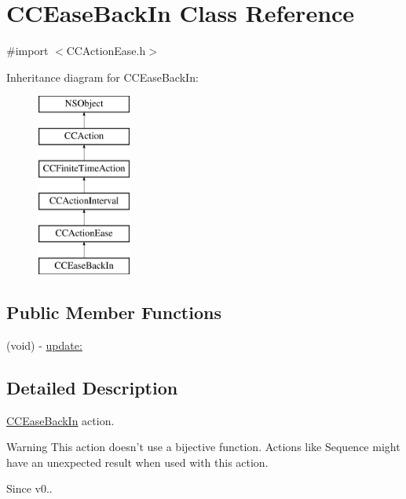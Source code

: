 \hypertarget{interface_c_c_ease_back_in}{\section{C\-C\-Ease\-Back\-In Class Reference}
\label{interface_c_c_ease_back_in}
}


{\ttfamily \#import $<$C\-C\-Action\-Ease.\-h$>$}

Inheritance diagram for C\-C\-Ease\-Back\-In\-:\begin{figure}[H]
\begin{center}
\leavevmode
\includegraphics[height=6.000000cm]{interface_c_c_ease_back_in}
\end{center}
\end{figure}
\subsection*{Public Member Functions}
\begin{DoxyCompactItemize}
\item 
(void) -\/ \hyperlink{interface_c_c_ease_back_in_a53b77d4e1c03578cdfc3245ebb1bbee1}{update\-:}
\end{DoxyCompactItemize}


\subsection{Detailed Description}
\hyperlink{interface_c_c_ease_back_in}{C\-C\-Ease\-Back\-In} action. \begin{DoxyWarning}{Warning}
This action doesn't use a bijective function. Actions like Sequence might have an unexpected result when used with this action. 
\end{DoxyWarning}
\begin{DoxySince}{Since}
v0.. 
\end{DoxySince}



